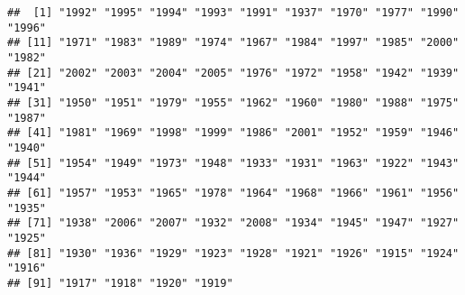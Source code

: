 \documentclass[
]{article}
\newenvironment{Shaded}{\begin{snugshade}}{\end{snugshade}}
\newcommand{\CommentTok}[1]{\textcolor[rgb]{0.56,0.35,0.01}{\textit{#1}}}
\newcommand{\DecValTok}[1]{\textcolor[rgb]{0.00,0.00,0.81}{#1}}
\newcommand{\KeywordTok}[1]{\textcolor[rgb]{0.13,0.29,0.53}{\textbf{#1}}}
\newcommand{\NormalTok}[1]{#1}
\newcommand{\OperatorTok}[1]{\textcolor[rgb]{0.81,0.36,0.00}{\textbf{#1}}}
\newcommand{\StringTok}[1]{\textcolor[rgb]{0.31,0.60,0.02}{#1}}
\begin{document}
\begin{Shaded}
\end{Shaded}

\begin{verbatim}
##  [1] "1992" "1995" "1994" "1993" "1991" "1937" "1970" "1977" "1990" "1996"
## [11] "1971" "1983" "1989" "1974" "1967" "1984" "1997" "1985" "2000" "1982"
## [21] "2002" "2003" "2004" "2005" "1976" "1972" "1958" "1942" "1939" "1941"
## [31] "1950" "1951" "1979" "1955" "1962" "1960" "1980" "1988" "1975" "1987"
## [41] "1981" "1969" "1998" "1999" "1986" "2001" "1952" "1959" "1946" "1940"
## [51] "1954" "1949" "1973" "1948" "1933" "1931" "1963" "1922" "1943" "1944"
## [61] "1957" "1953" "1965" "1978" "1964" "1968" "1966" "1961" "1956" "1935"
## [71] "1938" "2006" "2007" "1932" "2008" "1934" "1945" "1947" "1927" "1925"
## [81] "1930" "1936" "1929" "1923" "1928" "1921" "1926" "1915" "1924" "1916"
## [91] "1917" "1918" "1920" "1919"
\end{verbatim}

\begin{Shaded}
\end{Shaded}
\end{document}

